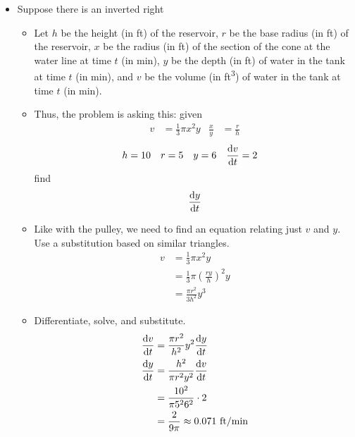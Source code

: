\documentclass[../main.tex]{subfiles}
\begin{document}
\begin{itemize}
\begin{itemize}
    \end{itemize}
    \item Suppose there is an inverted right 
    \begin{itemize}
        \item Let $h$ be the height (in ft) of the reservoir, $r$ be the base radius (in ft) of the reservoir, $x$ be the radius (in ft) of the section of the cone at the water line at time $t$ (in min), $y$ be the depth (in ft) of water in the tank at time $t$ (in min), and $v$ be the volume (in ft\textsuperscript{3}) of water in the tank at time $t$ (in min).
        \item Thus, the problem is asking this: given
        \begin{align*}
            v &= \frac{1}{3}\pi x^2y&
            \frac{x}{y} &= \frac{r}{h}
        \end{align*}
        \begin{align*}
            h &= 10&
            r &= 5&
            y &= 6&
            \dv{v}{t} &= 2
        \end{align*}
        find
        \begin{equation*}
            \dv{y}{t}
        \end{equation*}
        \item Like with the pulley, we need to find an equation relating just $v$ and $y$. Use a substitution based on similar triangles.
        \begin{align*}
            v &= \frac{1}{3}\pi x^2y\\
            &= \frac{1}{3}\pi \left( \frac{ry}{h} \right)^2y\\
            &= \frac{\pi r^2}{3h^2}y^3
        \end{align*}
        \item Differentiate, solve, and substitute.
        \begin{align*}
            \dv{v}{t} &= \frac{\pi r^2}{h^2}y^2\dv{y}{t}\\
            \dv{y}{t} &= \frac{h^2}{\pi r^2y^2}\dv{v}{t}\\
            &= \frac{10^2}{\pi 5^26^2}\cdot 2\\
            &= \frac{2}{9\pi} \approx 0.071\text{ ft/min}
        \end{align*}
    \end{itemize}
\end{itemize}
\end{document}
